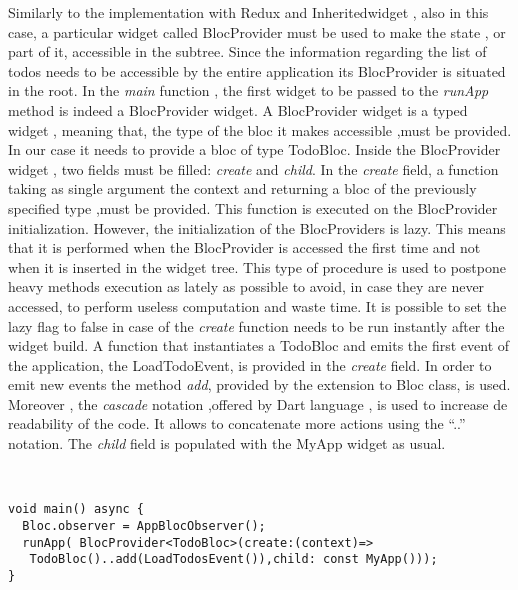 Similarly to the implementation with Redux and Inheritedwidget , also in this case, a particular widget called BlocProvider must be used to make the state , or part of it, accessible in the subtree. Since the information regarding the list of todos needs to be accessible by the entire application its BlocProvider is situated in the root. In the \textit{main} function , the first widget to be passed to the \textit{runApp} method is indeed a BlocProvider widget. A BlocProvider widget is a typed widget , meaning that, the type of the bloc it makes accessible ,must be provided. In our case it needs to provide a bloc of type TodoBloc. Inside the BlocProvider widget , two fields must  be filled: \textit{create} and \textit{child}. In the \textit{create} field, a function taking as single argument the context and returning a bloc of the previously specified type ,must be provided. This function is executed on the BlocProvider initialization. However, the initialization of the BlocProviders is lazy. This means that it is performed when the BlocProvider is accessed the first time and not when it is inserted in the widget tree. This type of procedure is used to postpone heavy methods execution as lately as possible to avoid, in case they are never accessed, to perform useless computation and waste time. It is possible to set the lazy flag to false in case of the \textit{create} function needs to be run instantly after the widget build. A function that instantiates a TodoBloc and emits the first event of the application, the LoadTodoEvent, is provided in the \textit{create} field. In order to emit new events the method \textit{add}, provided by the extension to Bloc class, is used. Moreover , the \textit{cascade} notation ,offered by Dart language , is used to increase de readability of the code. It allows to concatenate more actions using the  “..” notation.
The \textit{child} field is populated with the MyApp widget as usual.
\begin{code}
\mbox{}\\
 \mbox{}
\label{code:2.14}
\begin{verbatim}
void main() async {
  Bloc.observer = AppBlocObserver();
  runApp( BlocProvider<TodoBloc>(create:(context)=>
   TodoBloc()..add(LoadTodosEvent()),child: const MyApp()));
}
\end{verbatim}
\mbox{}
\end{code}


